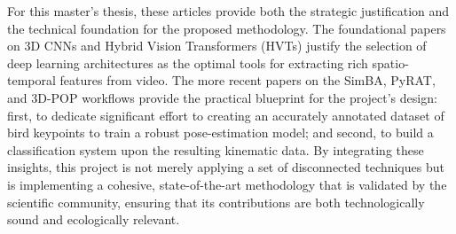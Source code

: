 For this master's thesis, these articles provide both the strategic justification and the technical foundation for the proposed methodology. The foundational papers on 3D CNNs and Hybrid Vision Transformers (HVTs) justify the selection of deep learning architectures as the optimal tools for extracting rich spatio-temporal features from video. The more recent papers on the SimBA, PyRAT, and 3D-POP workflows provide the practical blueprint for the project's design: first, to dedicate significant effort to creating an accurately annotated dataset of bird keypoints to train a robust pose-estimation model; and second, to build a classification system upon the resulting kinematic data. By integrating these insights, this project is not merely applying a set of disconnected techniques but is implementing a cohesive, state-of-the-art methodology that is validated by the scientific community, ensuring that its contributions are both technologically sound and ecologically relevant.